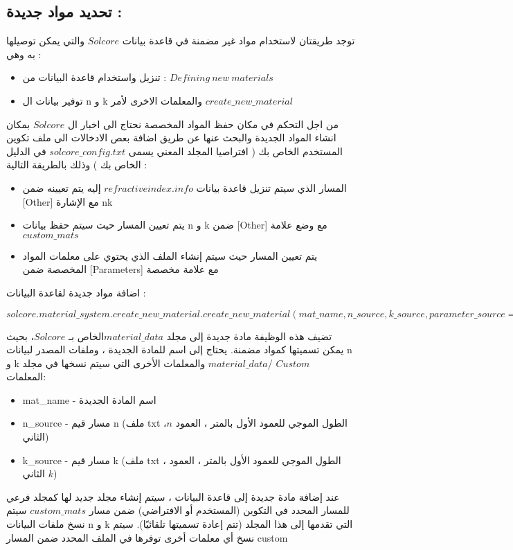 \subsection{ تحديد مواد جديدة   :  }
توجد طريقتان لاستخدام مواد غير مضمنة في قاعدة بيانات $ Solcore $ والتي يمكن توصيلها به وهي :
\begin{itemize}
	\item تنزيل واستخدام قاعدة البيانات من : $ Defining~ new  ~materials $
	\item  توفير بيانات ال n  و k  والمعلمات الاخرى لأمر $ create\_ new\_material $
\end{itemize}
من اجل التحكم في مكان حفظ المواد المخصصة نحتاج الى اخبار ال $ Solcore $ بمكان انشاء المواد الجديدة والبحث عنها عن طريق اضافة بعص الادخالات الى ملف تكوين المستخدم الخاص بك ( افتراصيا المجلد المعني يسمى $ solcore\_config.txt $ في الدليل الخاص بك ) وذلك بالطريقة التالية :
\begin{itemize}
	\item المسار الذي سيتم تنزيل قاعدة بيانات $ refractiveindex.info $ إليه يتم تعيينه ضمن [Other] مع الإشارة nk
	\item يتم تعيين المسار حيث سيتم حفظ بيانات n و k ضمن [Other] مع وضع علامة$  custom \_mats $
	\item يتم تعيين المسار حيث سيتم إنشاء الملف الذي يحتوي على معلمات المواد المخصصة ضمن [Parameters] مع علامة مخصصة
\end{itemize} 
اضافة مواد جديدة لقاعدة البيانات : 
\begin{flushleft}
	$ solcore.material\_system.create\_new\_material.create\_new\_material(mat\_name, n\_source, k\_source, parameter\_source=None, overwrite=False) $
\end{flushleft} 
تضيف هذه الوظيفة مادة جديدة إلى مجلد $ material\_data  $الخاص بـ $ Solcore  $، بحيث يمكن تسميتها كمواد مضمنة. يحتاج إلى اسم للمادة الجديدة ، وملفات المصدر لبيانات n و k والمعلمات الأخرى التي سيتم نسخها في مجلد $ material\_data  $/ $ Custom $ 
\\ 
المعلمات: 
\begin{itemize}
	\item mat\_name - اسم المادة الجديدة
	\item  n\_source - مسار قيم n (ملف txt ،$ n  $ الطول الموجي للعمود الأول بالمتر ، العمود الثاني)
	\item  k\_source - مسار قيم  k (ملف txt ، الطول الموجي للعمود الأول بالمتر ، العمود الثاني $ k $)
\end{itemize}
عند إضافة مادة جديدة إلى قاعدة البيانات ، سيتم إنشاء مجلد جديد لها كمجلد فرعي للمسار المحدد في التكوين (المستخدم أو الافتراضي) ضمن مسار $ custom\_mats $ سيتم نسخ ملفات البيانات n و k التي تقدمها إلى هذا المجلد (تتم إعادة تسميتها تلقائيًا). سيتم نسخ أي معلمات أخرى توفرها في الملف المحدد ضمن المسار custom   
